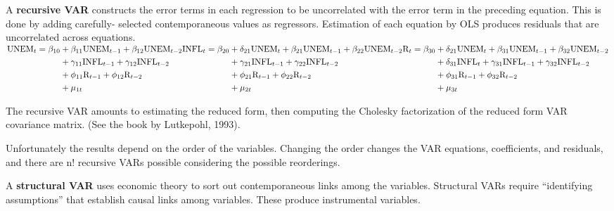 \documentclass[
  ignorenonframetext,
]{beamer}
\begin{document}
\begin{frame}
A \textbf{recursive VAR} constructs the error terms in each regression
to be uncorrelated with the error term in the preceding equation. This
is done by adding carefully- selected contemporaneous values as
regressors. Estimation of each equation by OLS produces residuals that
are uncorrelated across equations.
\(\begin{aligned}\text{UNEM}_t = \beta_{10} &+ \beta_{11}\text{UNEM}_{t-1} + \beta_{12}\text{UNEM}_{t-2}\\&+ \gamma_{11}\text{INFL}_{t-1} + \gamma_{12}\text{INFL}_{t-2} \\&+ \phi_{11}\text{R}_{t-1} + \phi_{12}\text{R}_{t-2} \\&+ \mu_{1t}\end{aligned}\\ \ \\ \begin{aligned}\text{INFL}_t = \beta_{20} &+ \delta_{21}\text{UNEM}_{t} + \beta_{21}\text{UNEM}_{t-1} + \beta_{22}\text{UNEM}_{t-2}\\ &+ \gamma_{21}\text{INFL}_{t-1} + \gamma_{22}\text{INFL}_{t-2} \\&+ \phi_{21}\text{R}_{t-1} + \phi_{22}\text{R}_{t-2} \\&+ \mu_{2t}\end{aligned}\\ \ \\ \begin{aligned}\text{R}_t = \beta_{30} &+ \delta_{21}\text{UNEM}_{t} + \beta_{31}\text{UNEM}_{t-1} + \beta_{32}\text{UNEM}_{t-2}\\ &+ \delta_{31}\text{INFL}_{t} +\gamma_{31}\text{INFL}_{t-1} + \gamma_{32}\text{INFL}_{t-2} \\&+ \phi_{31}\text{R}_{t-1} + \phi_{32}\text{R}_{t-2} \\&+ \mu_{3t}\end{aligned}\)

The recursive VAR amounts to estimating the reduced form, then computing
the Cholesky factorization of the reduced form VAR covariance matrix.
(See the book by Lutkepohl, 1993).

Unfortunately the results depend on the order of the variables. Changing
the order changes the VAR equations, coefficients, and residuals, and
there are n! recursive VARs possible considering the possible
reorderings.

A \textbf{structural VAR} uses economic theory to sort out
contemporaneous links among the variables. Structural VARs require
``identifying assumptions'' that establish causal links among variables.
These produce instrumental variables.
\end{frame}
\end{document}

